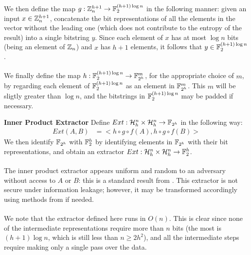 \paragraph{}
We then define the map $g: \mathbb{Z}_n^{h+1} \rightarrow \mathbb{F}_2^{(h+1) \log{n}}$ in the following manner: given an input $x \in \mathbb{Z}_n^{h+1}$, concatenate the bit representations of all the elements in the vector without the leading one (which does not contribute to the entropy of the result) into a single bitstring $y$. Since each element of $x$ has at most $\log{n}$ bits (being an element of $\mathbb{Z}_n$) and $x$ has $h+1$ elements, it follows that $y \in \mathbb{F}_2^{(h+1) \log{n}}$.

\paragraph{}
We finally define the map $h: \mathbb{F}_2^{(h+1) \log{n}} \rightarrow \mathbb{F}_{2^h}^m$, for the appropriate choice of $m$, by regarding each element of $\mathbb{F}_2^{(h+1) \log{n}}$ as an element in $\mathbb{F}_{2^h}^m$. This $m$ will be sligtly greater than $\log{n}$, and the bitstrings in $\mathbb{F}_2^{(h+1) \log{n}}$ may be padded if necessary.

\theoremstyle{definition}
\begin{definition}{\textbf{Inner Product Extractor}}
Define $Ext: \mathcal{H}_h^n \times \mathcal{H}_h^n \rightarrow \mathbb{F}_{2^h}$ in the following way:
\begin{align*}
    Ext(A, B) &= <h \circ g \circ f(A), h \circ g \circ f(B)>
\end{align*}
We then identify $\mathbb{F}_{2^h}$ with $\mathbb{F}_2^h$ by identifying elements in $\mathbb{F}_{2^h}$ with their bit representations, and obtain an extractor $Ext: \mathcal{H}_h^n \times \mathcal{H}_h^n \rightarrow \mathbb{F}_2^h$.
\end{definition}

\paragraph{}
The inner product extractor appears uniform and random to an adversary without access to $A$ or $B$: this is a standard result from \cite{chor1988unbiased}. This extractor is not secure under information leakage; however, it may be transformed accordingly using methods from \cite{dziembowski2011leakage} if needed.

\paragraph{}
We note that the extractor defined here runs in $O(n)$. This is clear since none of the intermediate representations require more than $n$ bits (the most is $(h+1) \log{n}$, which is still less than $n \geq 2h^2$), and all the intermediate steps require making only a single pass over the data.

